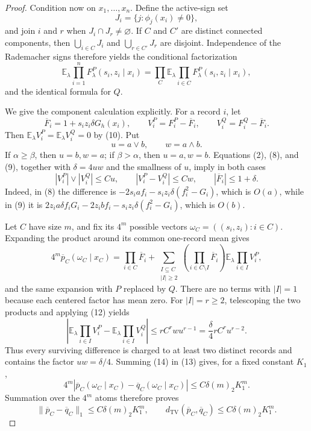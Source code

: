 \documentclass{article}
\begin{document}
\begin{proof}
Condition now on \(x_1,\ldots,x_n\).  Define the active-sign set
\[
 J_i=\{j:\phi_j(x_i)\ne0\},
\]
and join \(i\) and \(r\) when \(J_i\cap J_r\ne\varnothing\).  If \(C\) and \(C'\) are distinct connected components, then \(\bigcup_{i\in C}J_i\) and \(\bigcup_{r\in C'}J_r\) are disjoint.  Independence of the Rademacher signs therefore yields the conditional factorization
\[
 \mathbb E_\lambda\prod_{i=1}^nF^P_\lambda(s_i,z_i\mid x_i)
 =\prod_C\mathbb E_\lambda\prod_{i\in C}F^P_\lambda(s_i,z_i\mid x_i),
 \tag{11}
\]
and the identical formula for \(Q\).

We give the component calculation explicitly.  For a record \(i\), let
\[
 \overline F_i=1+s_i z_i\delta G_h(x_i),\qquad
 V_i^P=F_i^P-\overline F_i,\qquad V_i^Q=F_i^Q-\overline F_i.
\]
Then \(\mathbb E_\lambda V_i^P=\mathbb E_\lambda V_i^Q=0\) by (10).  Put
\[
 u=a\vee b,\qquad w=a\wedge b.
\]
If \(\alpha\ge\beta\), then \(u=b,w=a\); if \(\beta>\alpha\), then \(u=a,w=b\).  Equations (2), (8), and (9), together with \(\delta=4uw\) and the smallness of \(u\), imply in both cases
\[
 |V_i^P|\vee|V_i^Q|\le C u,\qquad
 |V_i^P-V_i^Q|\le Cw,\qquad
 |\overline F_i|\le1+\delta.
 \tag{12}
\]
Indeed, in (8) the difference is \(-2s_i a f_i-s_i z_i\delta(f_i^2-G_i)\), which is \(O(a)\), while in (9) it is \(2z_i a\delta f_iG_i-2z_i b f_i-s_i z_i\delta(f_i^2-G_i)\), which is \(O(b)\).

Let \(C\) have size \(m\), and fix its \(4^m\) possible vectors \(\omega_C=((s_i,z_i):i\in C)\).  Expanding the product around its common one-record mean gives
\[
 4^m\overline p_C(\omega_C\mid x_C)
 =\prod_{i\in C}\overline F_i+
 \sum_{\substack{I\subseteq C\\ |I|\ge2}}
 \left(\prod_{i\in C\setminus I}\overline F_i\right)
 \mathbb E_\lambda\prod_{i\in I}V_i^P,
 \tag{13}
\]
and the same expansion with \(P\) replaced by \(Q\).  There are no terms with \(|I|=1\) because each centered factor has mean zero.  For \(|I|=r\ge2\), telescoping the two products and applying (12) yields
\[
 \left|\mathbb E_\lambda\prod_{i\in I}V_i^P-
 \mathbb E_\lambda\prod_{i\in I}V_i^Q\right|
 \le r C^r w u^{r-1}
 =\frac{\delta}{4}r C^r u^{r-2}.
 \tag{14}
\]
Thus every surviving difference is charged to at least two distinct records and contains the factor \(uw=\delta/4\).  Summing (14) in (13) gives, for a fixed constant \(K_1\),
\[
 4^m|\overline p_C(\omega_C\mid x_C)-\overline q_C(\omega_C\mid x_C)|
 \le C\delta(m)_2K_1^m.
 \tag{15}
\]
Summation over the \(4^m\) atoms therefore proves
\[
 \|\overline p_C-\overline q_C\|_1
 \le C\delta(m)_2K_1^m,\qquad
 d_{\mathrm{TV}}(\overline p_C,\overline q_C)
 \le C\delta(m)_2K_1^m.
 \tag{16}
\]


\end{proof}
\end{document}
